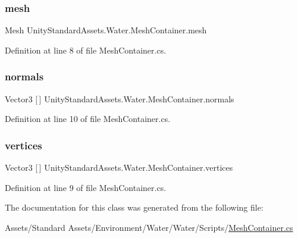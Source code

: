 \subsubsection{\texorpdfstring{mesh}{mesh}}
{\footnotesize\ttfamily Mesh Unity\+Standard\+Assets.\+Water.\+Mesh\+Container.\+mesh}



Definition at line 8 of file Mesh\+Container.\+cs.

\mbox{\label{class_unity_standard_assets_1_1_water_1_1_mesh_container_a954d32b18a55d83289fa567d17f28bdc}} 
\subsubsection{\texorpdfstring{normals}{normals}}
{\footnotesize\ttfamily Vector3 \mbox{[}$\,$\mbox{]} Unity\+Standard\+Assets.\+Water.\+Mesh\+Container.\+normals}



Definition at line 10 of file Mesh\+Container.\+cs.

\mbox{\label{class_unity_standard_assets_1_1_water_1_1_mesh_container_ab5e8bdf3abb08789b1aff3ee38f1922d}} 
\subsubsection{\texorpdfstring{vertices}{vertices}}
{\footnotesize\ttfamily Vector3 \mbox{[}$\,$\mbox{]} Unity\+Standard\+Assets.\+Water.\+Mesh\+Container.\+vertices}



Definition at line 9 of file Mesh\+Container.\+cs.



The documentation for this class was generated from the following file\+:\begin{DoxyCompactItemize}
\item 
Assets/\+Standard Assets/\+Environment/\+Water/\+Water/\+Scripts/\mbox{\hyperlink{_mesh_container_8cs}{Mesh\+Container.\+cs}}\end{DoxyCompactItemize}
